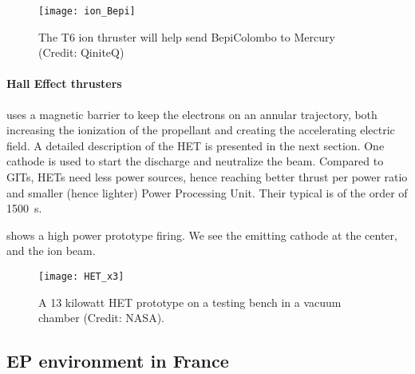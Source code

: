 \begin{figure}[hbtp]
  \centering
  \texttt{[image: ion\_Bepi]}
  \caption{The T6 ion thruster will help send BepiColombo to Mercury (Credit\string: QiniteQ)}
  \label{fig-iongridded}
\end{figure}
 
 \paragraph{Hall Effect thrusters} uses a magnetic barrier to keep the electrons on an annular trajectory, both increasing the ionization of the propellant and creating the accelerating electric field.
 A detailed description of the \ac{HET} is presented in the next section.
 One cathode is used to start the discharge and neutralize the beam.
 Compared to GITs, HETs need less power sources, hence reaching better thrust per power ratio and smaller (hence lighter) Power Processing Unit.
 Their typical \Isp is of the order of 1500~s.
 
  shows a high power prototype firing.
 We see the emitting cathode at the center, and the ion beam.
 \begin{figure}[hbtp]
   \centering
   \texttt{[image: HET\_x3]}
   \caption{A 13 kilowatt \ac{HET} prototype on a testing bench in a vacuum chamber (Credit\string: NASA).  }
   \label{fig-13kWHET}
 \end{figure}
 
 
 \subsection*{\ac{EP} environment in France} \label{subsec-HET_thruster}
 
